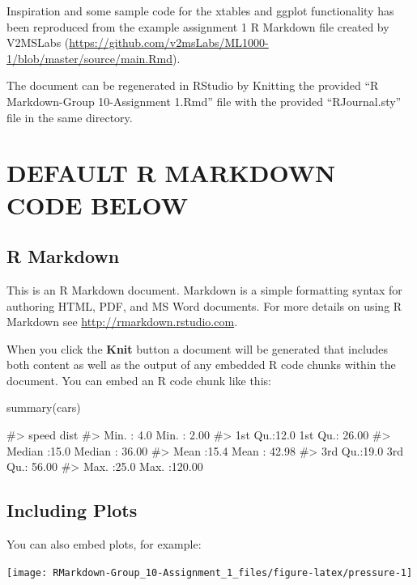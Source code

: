 Inspiration and some sample code for the xtables and ggplot
functionality has been reproduced from the example assignment 1 R
Markdown file created by V2MSLabs
(\url{https://github.com/v2msLabs/ML1000-1/blob/master/source/main.Rmd}).

The document can be regenerated in RStudio by Knitting the provided ``R
Markdown-Group 10-Assignment 1.Rmd'' file with the provided
``RJournal.sty'' file in the same directory.

\hypertarget{default-r-markdown-code-below}{%
\section{DEFAULT R MARKDOWN CODE
BELOW}\label{default-r-markdown-code-below}}

\hypertarget{r-markdown}{%
\subsection{R Markdown}\label{r-markdown}}

This is an R Markdown document. Markdown is a simple formatting syntax
for authoring HTML, PDF, and MS Word documents. For more details on
using R Markdown see \url{http://rmarkdown.rstudio.com}.

When you click the \textbf{Knit} button a document will be generated
that includes both content as well as the output of any embedded R code
chunks within the document. You can embed an R code chunk like this:

\begin{Schunk}
\begin{Sinput}
summary(cars)
\end{Sinput}
\begin{Soutput}
#>      speed           dist       
#>  Min.   : 4.0   Min.   :  2.00  
#>  1st Qu.:12.0   1st Qu.: 26.00  
#>  Median :15.0   Median : 36.00  
#>  Mean   :15.4   Mean   : 42.98  
#>  3rd Qu.:19.0   3rd Qu.: 56.00  
#>  Max.   :25.0   Max.   :120.00
\end{Soutput}
\end{Schunk}

\hypertarget{including-plots}{%
\subsection{Including Plots}\label{including-plots}}

You can also embed plots, for example:

\begin{Schunk}

\texttt{[image: RMarkdown-Group\_10-Assignment\_1\_files/figure-latex/pressure-1]} \end{Schunk}


